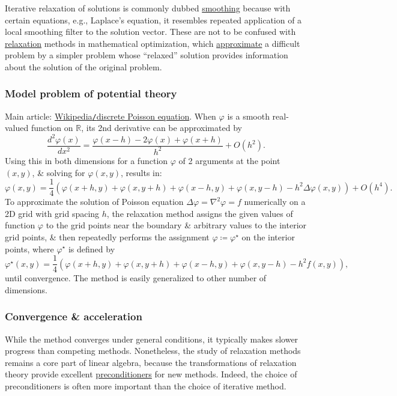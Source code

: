 \documentclass{article}
\begin{document}
Iterative relaxation of solutions is commonly dubbed \href{https://en.wikipedia.org/wiki/Smoothing}{smoothing} because with certain equations, e.g., Laplace's equation, it resembles repeated application of a local smoothing filter to the solution vector. These are not to be confused with \href{https://en.wikipedia.org/wiki/Relaxation_(approximation)}{relaxation} methods in mathematical optimization, which \href{https://en.wikipedia.org/wiki/Approximation_theory}{approximate} a difficult problem by a simpler problem whose ``relaxed'' solution provides information about the solution of the original problem.

\subsubsection{Model problem of potential theory}
Main article: \href{https://en.wikipedia.org/wiki/Discrete_Poisson_equation}{Wikipedia{\tt/}discrete Poisson equation}. When $\varphi$ is a smooth real-valued function on $\mathbb{R}$, its 2nd derivative can be approximated by
\begin{equation}
	\frac{d^2\varphi(x)}{dx^2} = \frac{\varphi(x - h) - 2\varphi(x) + \varphi(x + h)}{h^2} + O(h^2).
\end{equation}
Using this in both dimensions for a function $\varphi$ of 2 arguments at the point $(x,y)$, \& solving for $\varphi(x,y)$, results in:
\begin{equation}
	\varphi(x,y) = \frac{1}{4}\left(\varphi(x + h,y) + \varphi(x,y + h) + \varphi(x - h,y) + \varphi(x,y - h) - h^2\Delta\varphi(x,y)\right) + O(h^4).
\end{equation}
To approximate the solution of Poisson equation $\Delta\varphi = \nabla^2\varphi = f$ numerically on a 2D grid with grid spacing $h$, the relaxation method assigns the given values of function $\varphi$ to the grid points near the boundary \& arbitrary values to the interior grid points, \& then repeatedly performs the assignment $\varphi\coloneqq\varphi^\star$ on the interior points, where $\varphi^\star$ is defined by
\begin{equation}
	\varphi^\star(x,y) = \frac{1}{4}\left(\varphi(x + h,y) + \varphi(x,y + h) + \varphi(x - h,y) + \varphi(x,y - h) - h^2f(x,y)\right),
\end{equation}
until convergence. The method is easily generalized to other number of dimensions.

\subsubsection{Convergence \& acceleration}
While the method converges under general conditions, it typically makes slower progress than competing methods. Nonetheless, the study of relaxation methods remains a core part of linear algebra, because the transformations of relaxation theory provide excellent \href{https://en.wikipedia.org/wiki/Preconditioner}{preconditioners} for new methods. Indeed, the choice of preconditioners is often more important than the choice of iterative method.
\end{document}

